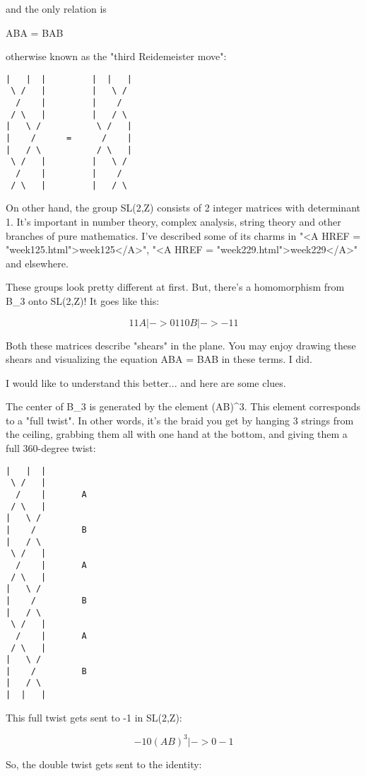 and the only relation is

ABA = BAB

otherwise known as the "third Reidemeister move":

\begin{verbatim}
|   |  |         |  |   | 
 \ /   |         |   \ /
  /    |         |    / 
 / \   |         |   / \
|   \ /           \ /   |  
|    /      =      /    | 
|   / \           / \   | 
 \ /   |         |   \ / 
  /    |         |    /
 / \   |         |   / \  
\end{verbatim}
    
On other hand, the group SL(2,Z) consists of 2 integer matrices with
determinant 1.  It's important in number theory, complex analysis,
string theory and other branches of pure mathematics.  I've described
some of its charms in "<A HREF =
"week125.html">week125</A>", "<A HREF =
"week229.html">week229</A>" and elsewhere.

These groups look pretty different at first.  But, there's a 
homomorphism from B_{3} onto SL(2,Z)!  It goes like this:

$$
        1   1
A |->  
        0   1


        1   0
B |->  
       -1   1
$$
    

Both these matrices describe "shears" in the plane.  
You may enjoy drawing these shears and visualizing the equation 
ABA = BAB in these terms.  I did.

I would like to understand this better... and here are some clues.

The center of B_{3} is generated by the element (AB)^{3}.  
This element corresponds to a "full twist".  In other words, it's
the braid you get by hanging 3 strings from the ceiling, grabbing 
them all with one hand at the bottom, and giving them a full 360-degree 
twist:

\begin{verbatim}
|   |  |  
 \ /   | 
  /    |       A
 / \   |
|   \ /    
|    /         B 
|   / \   
 \ /   | 
  /    |       A
 / \   |
|   \ /    
|    /         B 
|   / \   
 \ /   | 
  /    |       A
 / \   |
|   \ /    
|    /         B 
|   / \   
|  |   |
\end{verbatim}
    
This full twist gets sent to -1 in SL(2,Z):

$$
             -1   0 
(AB)^{3} |->  
              0  -1
$$
    
So, the double twist gets sent to the identity:

